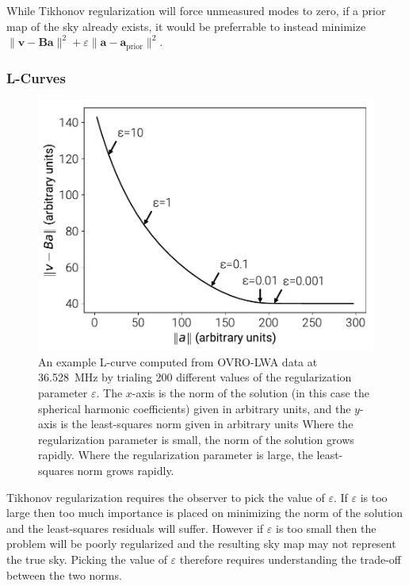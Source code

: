 \documentclass[twocolumn]{aastex61}
\renewcommand{\b}{\pmb}
\begin{document}
While Tikhonov regularization will force unmeasured modes to zero, if a prior map of the sky already
exists, it would be preferrable to instead minimize $\|\b v - \b B\b a\|^2 + \varepsilon \|\b a-\b
a_\text{prior}\|^2$.

\subsubsection{L-Curves}

\begin{figure}[t]
    \includegraphics[width=\columnwidth]{figures/lcurve/lcurve}
    \caption{
        An example L-curve computed from OVRO-LWA data at 36.528~MHz by trialing 200 different
        values of the regularization parameter $\varepsilon$. The $x$-axis is the norm of the
        solution (in this case the spherical harmonic coefficients) given in arbitrary units, and
        the $y$-axis is the least-squares norm given in arbitrary units Where the regularization
        parameter is small, the norm of the solution grows rapidly. Where the regularization
        parameter is large, the least-squares norm grows rapidly.
    }
    \label{fig:lcurve}
\end{figure}

Tikhonov regularization requires the observer to pick the value of $\varepsilon$. If $\varepsilon$
is too large then too much importance is placed on minimizing the norm of the solution and the
least-squares residuals will suffer. However if $\varepsilon$ is too small then the problem will be
poorly regularized and the resulting sky map may not represent the true sky. Picking the value of
$\varepsilon$ therefore requires understanding the trade-off between the two norms.
\end{document}
